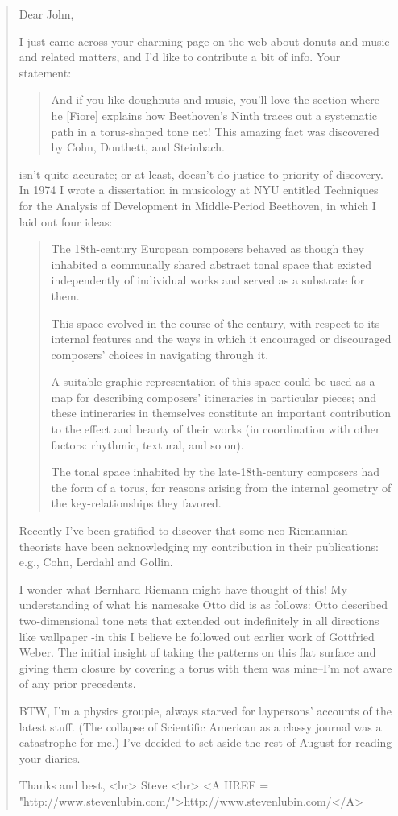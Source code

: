 \begin{quote}
Dear John,

I just came across your charming page on the web about donuts and music 
and related matters, and I'd like to contribute a bit of info.  Your statement:

\begin{quote}
And if you like doughnuts and music, you'll love the section where he 
[Fiore] explains how Beethoven's Ninth traces out a systematic path in a 
torus-shaped tone net! This amazing fact was discovered by Cohn, 
Douthett, and Steinbach.
\end{quote}

isn't quite accurate; or at least, doesn't do justice to priority of 
discovery.  In 1974 I wrote a dissertation in musicology at NYU entitled 
Techniques for the Analysis of Development in Middle-Period Beethoven, 
in which I laid out four ideas:

\begin{quote}
The 18th-century European composers behaved as though they inhabited a 
communally shared abstract tonal space that existed independently of 
individual works and served as a substrate for them.

This space evolved in the course of the century, with respect to its 
internal features and the ways in which it encouraged or discouraged 
composers' choices in navigating through it.

A suitable graphic representation of this space could be used as a map 
for describing composers' itineraries in particular pieces; and these 
intineraries in themselves constitute an important contribution to the 
effect and beauty of their works (in coordination with other factors: 
rhythmic, textural, and so on).

The tonal space inhabited by the late-18th-century composers had the 
form of a torus, for reasons arising from the internal geometry of the 
key-relationships they favored.
\end{quote}

Recently I've been gratified to discover that some neo-Riemannian 
theorists have been acknowledging my contribution in their publications: 
e.g., Cohn, Lerdahl and Gollin.

I wonder what Bernhard Riemann might have thought of this!  My 
understanding of what his namesake Otto did is as follows: Otto 
described two-dimensional tone nets that extended out indefinitely in 
all directions like wallpaper -in this I believe he followed out earlier 
work of Gottfried Weber.  The initial insight of taking the patterns on 
this flat surface and giving them closure by covering a torus with them 
was mine--I'm not aware of any prior precedents.

BTW, I'm a physics groupie, always starved for laypersons' accounts of 
the latest stuff.  (The collapse of Scientific American as a classy 
journal was a catastrophe for me.)  I've decided to set aside the rest 
of August for reading your diaries.

Thanks and best, <br>
Steve <br>
<A HREF = "http://www.stevenlubin.com/">http://www.stevenlubin.com/</A>
\end{quote}



